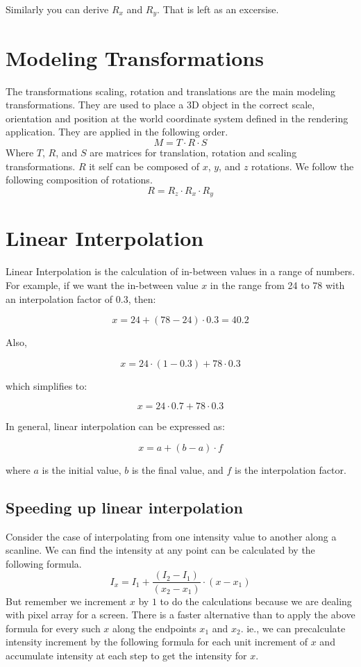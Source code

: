 Similarly you can derive \(R_x\) and \(R_y\). That is left as an excersise.
\section{Modeling Transformations}
The transformations scaling, rotation and translations are the main modeling transformations. They are used to place a 3D object in the correct scale, orientation and position at the world coordinate system defined in the rendering application. They are applied in the following order.
\begin{equation}
M = T \cdot R \cdot S
\end{equation}
Where $T$, $R$, and $S$ are matrices for translation, rotation and scaling transformations.  $R$ it self can be composed of $x$, $y$, and $z$ rotations. We follow the following composition of rotations.
\begin{equation}
R = R_z \cdot R_x \cdot R_y
\end{equation}

\section{Linear Interpolation}
Linear Interpolation is the calculation of in-between values in a range of numbers. For example, if we want the in-between value $x$ in the range from 24 to 78 with an interpolation factor of 0.3, then:

\[
x = 24 + (78 - 24) \cdot 0.3 = 40.2
\]

Also,

\[
x = 24 \cdot (1 - 0.3) + 78 \cdot 0.3
\]

which simplifies to:

\[
x = 24 \cdot 0.7 + 78 \cdot 0.3
\]

In general, linear interpolation can be expressed as:

\begin{equation}
x = a + (b - a) \cdot f
\end{equation}

where $a$ is the initial value, $b$ is the final value, and $f$ is the interpolation factor.


\subsection {Speeding up linear interpolation}
Consider the case of interpolating from one intensity value to another along a scanline. We can find the intensity at any point can be calculated by the following formula.
\[ 
I_x = I_1 + \frac{(I_2 - I_1)}{(x_2 - x_1)}  \cdot {(x-x_1)}
\]
But remember we increment $x$ by $1$ to do the calculations because we are dealing with pixel array for a screen.
There is a faster alternative than to apply the above formula for every such $x$ along the endpoints $x_1$ and $x_2$. ie., we can precalculate intensity increment by the following formula for each unit increment of $x$ and accumulate intensity at each step to get the intensity for $x$.

